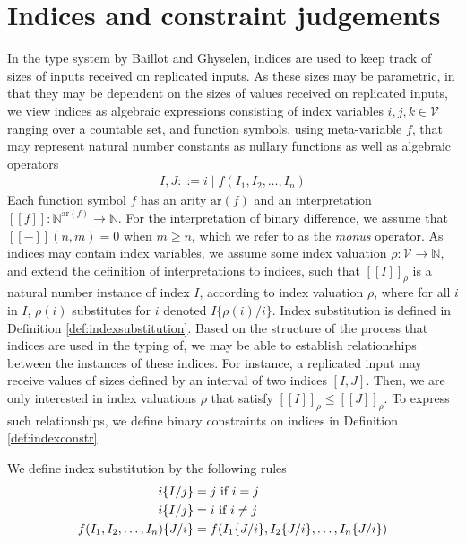 \section{Indices and constraint judgements}\label{sec:indicesandjudgements}
In the type system by Baillot and Ghyselen, indices are used to keep track of sizes of inputs received on replicated inputs. As these sizes may be parametric, in that they may be dependent on the sizes of values received on replicated inputs, we view indices as algebraic expressions consisting of index variables $i,j,k\in\mathcal{V}$ ranging over a countable set, and function symbols, using meta-variable $f$, that may represent natural number constants as nullary functions as well as algebraic operators
\begin{align*}
    I,J ::= i \mid f(I_1,I_2,\dots,I_n)
\end{align*}
Each function symbol $f$ has an arity $\text{ar}(f)$ and an interpretation $[\![f]\!] : \mathbb{N}^{\text{ar}(f)} \rightarrow \mathbb{N}$. For the interpretation of binary difference, we assume that $[\![-]\!](n,m) = 0$ when $m \geq n$, which we refer to as the \textit{monus} operator. As indices may contain index variables, we assume some index valuation $\rho : \mathcal{V} \rightarrow \mathbb{N}$, and extend the definition of interpretations to indices, such that $[\![I]\!]_\rho$ is a natural number instance of index $I$, according to index valuation $\rho$, where for all $i$ in $I$, $\rho(i)$ substitutes for $i$ denoted $I\{\rho(i)/i\}$. Index substitution is defined in Definition \ref{def:indexsubstitution}. Based on the structure of the process that indices are used in the typing of, we may be able to establish relationships between the instances of these indices. For instance, a replicated input may receive values of sizes defined by an interval of two indices $[I,J]$. Then, we are only interested in index valuations $\rho$ that satisfy $[\![I]\!]_\rho \leq [\![J]\!]_\rho$. To express such relationships, we define binary constraints on indices in Definition \ref{def:indexconstr}.

\begin{defi}\label{def:indexsubstitution}
    We define index substitution by the following rules
    \begin{align*}
        i\{I/j\} &= j \text{ if } i = j\\
        i\{I/j\} &= i \text{ if } i \not = j\\
        f(I_1, I_2, \dots, I_n)\{J/i\} &= f(I_1\{J/i\}, I_2\{J/i\}, \dots, I_n\{J/i\})
    \end{align*}
\end{defi}

